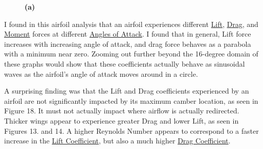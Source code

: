 \documentclass{article}
\begin{document}
\begin{figure}
  \centering
  \caption{ \textbf{(a)} }
  \label{run5}
\end{figure}

I found in this airfoil analysis that an airfoil experiences different \hyperlink{CL}{Lift}, \hyperlink{CL}{Drag}, and \hyperlink{CM}{Moment} forces at different \hyperlink{alpha}{Angles of Attack}. I found that in general, Lift force increases with increasing angle of attack, and drag force behaves as a parabola with a minimum near zero. Zooming out further beyond the 16-degree domain of these graphs would show that these coefficients actually behave as sinusoidal waves as the airfoil's angle of attack moves around in a circle.\newline

A surprising finding was that the Lift and Drag coefficients experienced by an airfoil are not significantly impacted by its maximum camber location, as seen in Figure 18. It must not actually impact where airflow is actually redirected. Thicker wings appear to experience greater Drag and lower Lift, as seen in Figures 13. and 14. A higher Reynolds Number appears to correspond to a faster increase in the \hyperlink{CL}{Lift Coefficient}, but also a much higher \hyperlink{CD}{Drag Coefficient}. \newline
\end{document}
